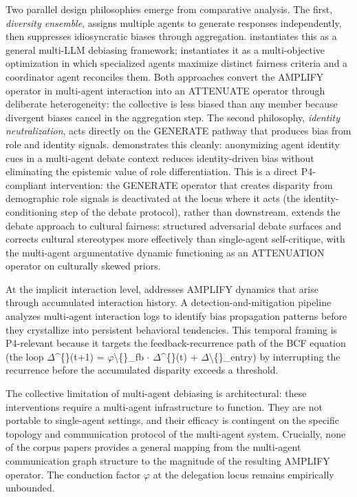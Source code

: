 \documentclass[10pt]{article}
\begin{document}
Two parallel design philosophies emerge from comparative analysis. The first, \emph{diversity ensemble}, assigns multiple agents to generate responses independently, then suppresses idiosyncratic biases through aggregation. \cite{owens2024multi} instantiates this as a general multi-LLM debiasing framework; \cite{xu2024mitigating} instantiates it as a multi-objective optimization in which specialized agents maximize distinct fairness criteria and a coordinator agent reconciles them. Both approaches convert the AMPLIFY operator in multi-agent interaction into an ATTENUATE operator through deliberate heterogeneity: the collective is less biased than any member because divergent biases cancel in the aggregation step. The second philosophy, \emph{identity neutralization}, acts directly on the GENERATE pathway that produces bias from role and identity signals. \cite{choi2025identity} demonstrates this cleanly: anonymizing agent identity cues in a multi-agent debate context reduces identity-driven bias without eliminating the epistemic value of role differentiation. This is a direct P4-compliant intervention: the GENERATE operator that creates disparity from demographic role signals is deactivated at the locus where it acts (the identity-conditioning step of the debate protocol), rather than downstream. \cite{ki2025multiple} extends the debate approach to cultural fairness: structured adversarial debate surfaces and corrects cultural stereotypes more effectively than single-agent self-critique, with the multi-agent argumentative dynamic functioning as an ATTENUATION operator on culturally skewed priors.

At the implicit interaction level, \cite{borah2024implicit} addresses AMPLIFY dynamics that arise through accumulated interaction history. A detection-and-mitigation pipeline analyzes multi-agent interaction logs to identify bias propagation patterns before they crystallize into persistent behavioral tendencies. This temporal framing is P4-relevant because it targets the feedback-recurrence path of the BCF equation (the loop $\Delta$\textasciicircum\{\}(t+1) = $\varphi$\textbackslash\{\}\_fb $\cdot$ $\Delta$\textasciicircum\{\}(t) + $\Delta$\textbackslash\{\}\_entry) by interrupting the recurrence before the accumulated disparity exceeds a threshold.

The collective limitation of multi-agent debiasing is architectural: these interventions require a multi-agent infrastructure to function. They are not portable to single-agent settings, and their efficacy is contingent on the specific topology and communication protocol of the multi-agent system. Crucially, none of the corpus papers provides a general mapping from the multi-agent communication graph structure to the magnitude of the resulting AMPLIFY operator. The conduction factor $\varphi$ at the delegation locus remains empirically unbounded.
\end{document}
